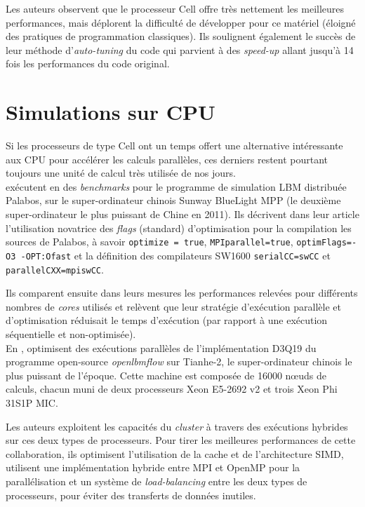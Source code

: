 Les auteurs observent que le processeur Cell offre très nettement les meilleures performances, mais déplorent la difficulté de développer pour ce matériel (éloigné des pratiques de programmation classiques). Ils soulignent également le succès de leur méthode d'\textit{auto-tuning} du code qui parvient à des \textit{speed-up} allant jusqu'à 14 fois les performances du code original.

\section{Simulations sur \acs{CPU}}
Si les processeurs de type Cell ont un temps offert une alternative intéressante aux \acs{CPU} pour accélérer les calculs parallèles, ces derniers restent pourtant toujours une unité de calcul très utilisée de nos jours.\\

\citet{min_performance_2013} exécutent en \citeyear{min_performance_2013} des \textit{benchmarks} pour le programme de simulation \acs{LBM} distribuée Palabos, sur le super-ordinateur chinois Sunway BlueLight MPP (le deuxième super-ordinateur le plus puissant de Chine en 2011). Ils décrivent dans leur article l'utilisation novatrice des \textit{flags} (standard) d'optimisation pour la compilation les sources de Palabos, à savoir \texttt{optimize = true}, \texttt{MPIparallel=true}, \texttt{optimFlags=-O3 -OPT:Ofast} et la définition des compilateurs SW1600 \texttt{serialCC=swCC} et \texttt{parallelCXX=mpiswCC}.

Ils comparent ensuite dans leurs mesures les performances relevées pour différents nombres de \textit{cores} utilisés et relèvent que leur stratégie d'exécution parallèle et d'optimisation réduisait le temps d'exécution (par rapport à une exécution séquentielle et non-optimisée).\\

En \citeyear{li_parallelizing_2016}, \citet{li_parallelizing_2016} optimisent des exécutions parallèles de l'implémentation D3Q19 du programme open-source \textit{openlbmflow} sur Tianhe-2, le super-ordinateur chinois le plus puissant de l'époque. Cette machine est composée de 16000 nœuds de calculs, chacun muni de deux processeurs Xeon E5-2692 v2 et trois Xeon Phi 31S1P MIC.

Les auteurs exploitent les capacités du \textit{cluster} à travers des exécutions hybrides sur ces deux types de processeurs. Pour tirer les meilleures performances de cette collaboration, ils optimisent l'utilisation de la cache et de l'architecture SIMD, utilisent une implémentation hybride entre MPI et OpenMP pour la parallélisation et un système de \textit{load-balancing} entre les deux types de processeurs, pour éviter des transferts de données inutiles.

